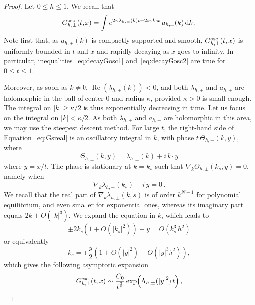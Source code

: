 \documentclass[a4paper,12pt]{amsart} %
\theoremstyle{plain}
\theoremstyle{definition}
\newcommand		{\lt}			{\left}				%
\newcommand		{\rt}			{\right}			%
\renewcommand	{\(}			{\lt(}
\renewcommand	{\)}			{\rt)}
\newcommand		{\n}[1]			{\lt\lvert{#1}\rt\rvert}	%
\renewcommand		{\d}		{\mathop{}\!\mathrm{d}}		%
\DeclareMathOperator{\re}		{Re}				%
\renewcommand	{\Re}[1]		{\re\!\( #1 \)}		%
\newcommand	{\h}			{h}
\newcommand		{\Gosc}			{G^{\textnormal{osc}}}
\begin{document}
	\begin{proof}
		Let $0 \le \h \le 1$. We recall that
		\begin{equation}\label{eq:Gsreal}
			\Gosc_{\h,\pm}(t,x) = \int e^{2\pi\lambda_{\h,\pm}(k) t + 2i\pi k \cdot x} \,a_{\h,\pm}(k) \d k \,.
		\end{equation}
		Note first that, as $a_{\h,\pm}(k)$ is compactly supported and smooth, $\Gosc_{\h,\pm}(t,x)$ is uniformly bounded in $t$ and $x$ and rapidly decaying as $x$ goes to infinity. In particular, inequalities~\eqref{eq:decayGosc1} and~\eqref{eq:decayGosc2} are true for $0 \le t \le 1$.
		
		Moreover, as soon as $k \ne 0$, %
		$\Re{\lambda_{\h,\pm}(k)} < 0$, and both $\lambda_{\h,\pm}$ and $a_{\h,\pm}$ are holomorphic in the ball of center $0$ and radius $\kappa$, provided $\kappa > 0$ is small enough. The integral on $\n{k} \ge \kappa/2$ is thus exponentially decreasing in time. Let us focus on the integral on $\n{k} < \kappa/2$. As both $\lambda_{\h,\pm}$ and $a_{\h,\pm}$ are holomorphic in this area, we may use the steepest descent method. For large $t$, the right-hand side of Equation~\eqref{eq:Gsreal} is an oscillatory integral in $k$, with phase $t\, \Theta_{\h,\pm}(k,y)$, where
		\begin{equation*}
			\Theta_{\h,\pm}(k,y) = \lambda_{\h,\pm}(k) + i\, k \cdot y
		\end{equation*}
		where $y = x/t$. 
		The phase is stationary at $k=k_s$ such that $\nabla_k \Theta_{\h,\pm}(k_s,y) = 0$, namely when
		\begin{equation*}
			\nabla_k \lambda_{\h,\pm}(k_s) + i \,y = 0 \, .
		\end{equation*}
		We recall that the real part of $\nabla_k \lambda_{\h,\pm}(k,s)$ is of order $k^{N-1}$ for polynomial equilibrium, and even smaller for exponential ones, whereas its imaginary part equals $2 k + O(\n{k}^3)$. We expand the equation in $k$, which leads to 
		\begin{equation*}
			\pm 2 k_s \lt(1+ O(\n{k_s}^2) \rt) + y = O(k_s^3\, h^2)
		\end{equation*}
		or equivalently
		\begin{equation} %
			k_s = \mp \frac{y}{2} \lt(1 + O(\n{y}^2) + O(\n{y}^3 h^2) \rt) ,
		\end{equation}
		which gives the following asymptotic expansion
		\begin{equation*}
			\Gosc_{\h,\pm}(t,x) \sim \frac{C_0}{t^{\frac{3}{2}}} \exp\!\( \Lambda_{\h,\pm}(\n{y}^2)\, t \) ,

\end{equation*}
\end{proof}
\end{document}
